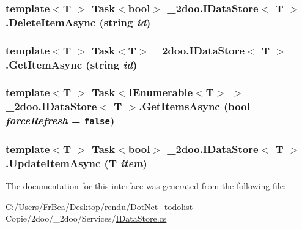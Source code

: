 \hypertarget{interface__2doo_1_1_i_data_store_3_01_t_01_4_505f00b79957746357809d59e74b3fbf}{
\subsubsection[{DeleteItemAsync}]{\setlength{\rightskip}{0pt plus 5cm}template$<$T $>$ Task$<$bool$>$ \_\-2doo.IDataStore$<$ T $>$.DeleteItemAsync (string {\em id})}}
\label{interface__2doo_1_1_i_data_store_3_01_t_01_4_505f00b79957746357809d59e74b3fbf}


\hypertarget{interface__2doo_1_1_i_data_store_3_01_t_01_4_d0162f5331b27ac6619a2960b52dfcbc}{
\subsubsection[{GetItemAsync}]{\setlength{\rightskip}{0pt plus 5cm}template$<$T $>$ Task$<$T$>$ \_\-2doo.IDataStore$<$ T $>$.GetItemAsync (string {\em id})}}
\label{interface__2doo_1_1_i_data_store_3_01_t_01_4_d0162f5331b27ac6619a2960b52dfcbc}


\hypertarget{interface__2doo_1_1_i_data_store_3_01_t_01_4_a356c1924727c6c124ee35652905040b}{
\subsubsection[{GetItemsAsync}]{\setlength{\rightskip}{0pt plus 5cm}template$<$T $>$ Task$<$IEnumerable$<$T$>$ $>$ \_\-2doo.IDataStore$<$ T $>$.GetItemsAsync (bool {\em forceRefresh} = {\tt false})}}
\label{interface__2doo_1_1_i_data_store_3_01_t_01_4_a356c1924727c6c124ee35652905040b}


\hypertarget{interface__2doo_1_1_i_data_store_3_01_t_01_4_677f1700f44688366f898d3c86d97a32}{
\subsubsection[{UpdateItemAsync}]{\setlength{\rightskip}{0pt plus 5cm}template$<$T $>$ Task$<$bool$>$ \_\-2doo.IDataStore$<$ T $>$.UpdateItemAsync (T {\em item})}}
\label{interface__2doo_1_1_i_data_store_3_01_t_01_4_677f1700f44688366f898d3c86d97a32}




The documentation for this interface was generated from the following file:\begin{CompactItemize}
\item 
C:/Users/FrBea/Desktop/rendu/DotNet\_\-todolist\_ - Copie/2doo/\_\-2doo/Services/\hyperlink{_i_data_store_8cs}{IDataStore.cs}\end{CompactItemize}
